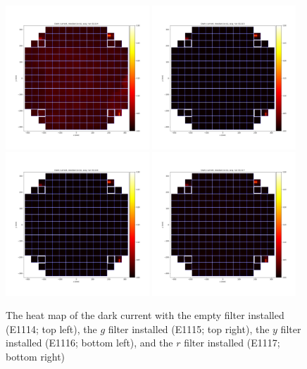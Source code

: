 \begin{figure}
\begin{centering}
\includegraphics[width=0.48\textwidth]{figures/E1114_Empty_DarkCurrent.png}
\includegraphics[width=0.48\textwidth]{figures/E1115_g_DarkCurrent.png} \\
\includegraphics[width=0.48\textwidth]{figures/E1116_y_DarkCurrent.png}
\includegraphics[width=0.48\textwidth]{figures/E1117_r_DarkCurrent.png}
\caption{ The heat map of the dark current with the empty filter installed (E1114; top left), the $g$ filter installed (E1115; top right), the $y$ filter installed (E1116; bottom left), and the $r$ filter installed (E1117; bottom right)  \label{fig:filter-darkcurrent}}
\end{centering}
\end{figure}

